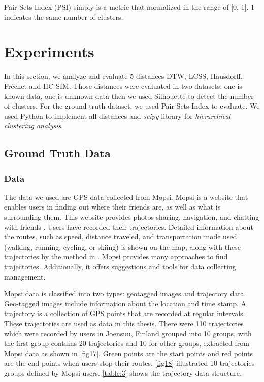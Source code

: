\documentclass[a4paper, 12pt]{article}
\begin{document}
Pair Sets Index (PSI) simply is a metric that normalized in the range of [0, 1]. 1 indicates the same number of clusters.

\pagebreak

\section{Experiments}

In this section, we analyze and evaluate 5 distances DTW, LCSS, Hausdorff, Fréchet and HC-SIM. Those distances were evaluated in two datasets: one is known data, one is unknown data then we used Silhouette to detect the number of clusters. For the ground-truth dataset, we used Pair Sets Index to evaluate. We used Python to implement all distances and \textit{scipy} library for \textit{hierarchical clustering analysis}.

\subsection{Ground Truth Data}

\subsubsection{Data}

The data we used are GPS data collected from Mopsi. Mopsi is a website that enables users in finding out where their friends are, as well as what is surrounding them. This website provides photos sharing, navigation, and chatting with friends \citep{mariescu2013detecting}. Users have recorded their trajectories. Detailed information about the routes, such as speed, distance traveled, and transportation mode used (walking, running, cycling, or skiing) is shown on the map, along with these trajectories by the method in \cite{waga2012detecting}. Mopsi provides many approaches to find trajectories. Additionally, it offers suggestions and tools for data collecting management. 

Mopsi data is classified into two types: geotagged images and trajectory data. Geo-tagged images include information about the location and time stamp. A trajectory is a collection of GPS points that are recorded at regular intervals. These trajectories are used as data in this thesis. There were 110 trajectories which were recorded by users in Joensuu, Finland grouped into 10 groups, with the first group contains 20 trajectories and 10 for other groups, extracted from Mopsi data as shown in \autoref{fig17}. Green points are the start points and red points are the end points when users stop their routes. \autoref{fig18} illustrated 10 trajectories groups defined by Mopsi users. \autoref{table:3} shows the trajectory data structure.
\end{document}
